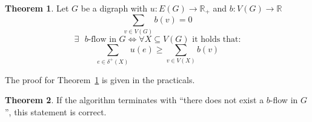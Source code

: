 \documentclass[a4paper]{article}
\theoremstyle{definition}
\newtheorem{theorem}{Theorem}
\begin{document}
\begin{theorem}\label{lemma-5.10}
  Let $G$ be a digraph with $u: E(G) \rightarrow \mathbb{R}_+$ and $b: V(G) \rightarrow \mathbb{R}$
  \[ \sum_{v \in V(G)} b(v) = 0 \]
  \begin{equation*}
    \exists \text{ $b$-flow in } G \Leftrightarrow \forall X \subseteq V(G) \text{ it holds that:}
  \end{equation*} \begin{equation*}
    \sum_{e \in \delta^+(X)} u(e) \geq \sum_{v \in V(X)} b(v)
  \end{equation*}
\end{theorem}

The proof for Theorem~\ref{lemma-5.10} is given in the practicals.

\begin{theorem}\label{proposition-5.9}
  If the algorithm terminates with ``there does not exist a $b$-flow in $G$'',
  this statement is correct.
\end{theorem}
\end{document}
